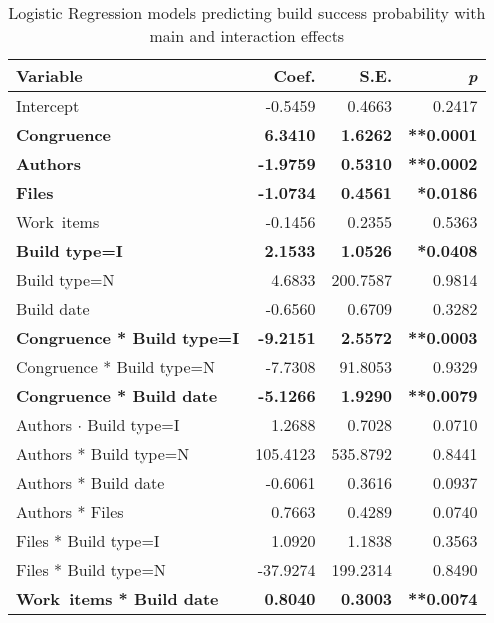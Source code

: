 \begin{table}[t]
\caption{Logistic Regression models predicting build success probability with main and interaction effects}
\begin{center}
\small
\begin{tabular}{l@{\hspace{15pt}}rrr}
\toprule
Variable & Coef. & S.E. & \emph{p} \\
	\midrule
Intercept                   &  -0.5459 &   0.4663 & 0.2417 \\
\textbf{Congruence}              &   \textbf{6.3410} &   \textbf{1.6262} & \textbf{**0.0001} \\
\textbf{Authors}                     &  \textbf{-1.9759} &   \textbf{0.5310} & \textbf{**0.0002}  \\
\textbf{Files}                       &  \textbf{-1.0734} &   \textbf{0.4561} & \textbf{*0.0186}  \\
Work~items                   &  -0.1456 &   0.2355 & 0.5363  \\
\textbf{Build type=I}                      &   \textbf{2.1533} &   \textbf{1.0526} & \textbf{*0.0408}  \\
Build type=N                      &   4.6833 & 200.7587 & 0.9814  \\
Build date                   &  -0.6560 &   0.6709 & 0.3282  \\
\textbf{Congruence * Build type=I}     &  \textbf{-9.2151} &   \textbf{2.5572} & \textbf{**0.0003}  \\
Congruence * Build type=N     &  -7.7308 &  91.8053 & 0.9329  \\
\textbf{Congruence * Build date}  &  \textbf{-5.1266} &   \textbf{1.9290} & \textbf{**0.0079}  \\
Authors $\cdot$ Build type=I            &   1.2688 &   0.7028 & 0.0710  \\
Authors * Build type=N            & 105.4123 & 535.8792 & 0.8441  \\
Authors * Build date         &  -0.6061 &   0.3616 & 0.0937 \\
Authors * Files             &   0.7663 &   0.4289 & 0.0740  \\
Files * Build type=I              &   1.0920 &   1.1838 & 0.3563  \\
Files * Build type=N              & -37.9274 & 199.2314 & 0.8490  \\
\textbf{Work~items * Build date}       &   \textbf{0.8040} &   \textbf{0.3003} & \textbf{**0.0074}  \\

\end{tabular}
\end{center}
\end{table}
